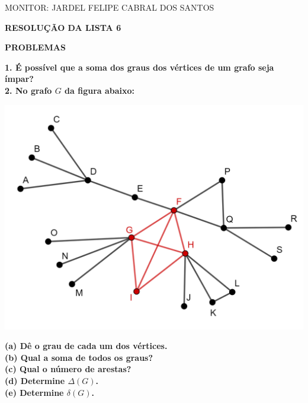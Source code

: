 \documentclass[12pt, a4paper]{article}
\begin{document}
\begin{flushleft}

MONITOR: JARDEL FELIPE CABRAL DOS SANTOS\\[1cm] 
\end{flushleft}

\begin{center} \textbf{RESOLUÇÃO DA LISTA 6}
\end{center}

\begin{center}
\textbf{PROBLEMAS}
\end{center}


\textbf{1. É possível que a soma dos graus dos vértices de um grafo seja ímpar?} \\


\textbf{2. No grafo \(G\) da figura abaixo:} 

\begin{center}
\includegraphics[scale=0.75]{grafo.png}
\end{center}

\textbf{(a) Dê o grau de cada um dos vértices.}\\

\textbf{(b) Qual a soma de todos os graus?} \\

\textbf{(c) Qual o número de arestas?} \\

\textbf{(d) Determine \(\Delta(G)\).} \\

\textbf{(e) Determine \(\delta(G)\).} \\
\end{document}
